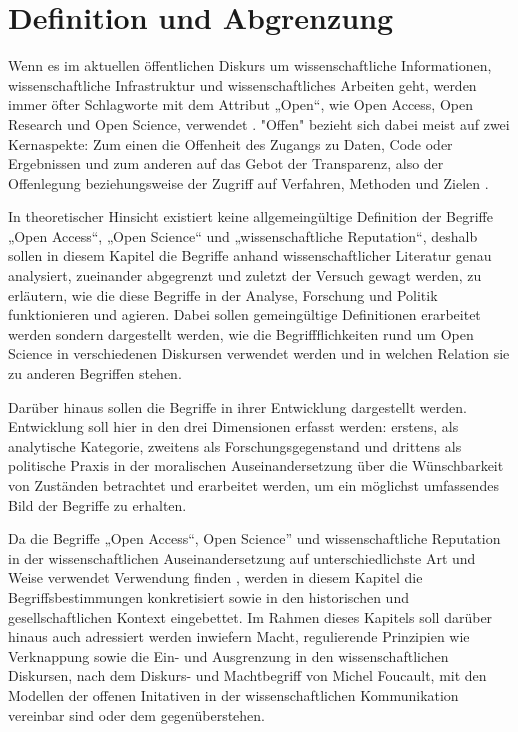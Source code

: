 \chapter{Definition und Abgrenzung} 
Wenn es im aktuellen öffentlichen Diskurs um wissenschaftliche Informationen, wissenschaftliche Infrastruktur und wissenschaftliches Arbeiten geht, werden immer öfter Schlagworte mit dem Attribut „Open“, wie Open Access, Open Research und Open Science, verwendet \cite{bunz_2014} \cite{schulze_2013_open}. "Offen" bezieht sich dabei meist auf zwei Kernaspekte: Zum einen die Offenheit des Zugangs zu Daten, Code oder Ergebnissen und zum anderen auf das Gebot der Transparenz, also der Offenlegung beziehungsweise der Zugriff auf Verfahren, Methoden und Zielen \cite{schulze_2013_open}.

In theoretischer Hinsicht existiert keine allgemeingültige Definition der Begriffe „Open Access“, „Open Science“ und „wissenschaftliche Reputation“, deshalb sollen in diesem Kapitel die Begriffe anhand wissenschaftlicher Literatur genau analysiert, zueinander abgegrenzt und zuletzt der Versuch gewagt werden, zu erläutern, wie die diese Begriffe in der Analyse, Forschung und Politik funktionieren und agieren. Dabei sollen gemeingültige Definitionen erarbeitet werden sondern dargestellt werden, wie die Begriffflichkeiten rund um Open Science in verschiedenen Diskursen verwendet werden und in welchen Relation sie zu anderen Begriffen stehen.

Darüber hinaus sollen die Begriffe in ihrer Entwicklung dargestellt werden. Entwicklung soll hier in den drei Dimensionen erfasst werden: erstens, als analytische Kategorie, zweitens als Forschungsgegenstand und drittens als politische Praxis in der moralischen Auseinandersetzung über die Wünschbarkeit von Zuständen betrachtet und erarbeitet werden, um ein möglichst umfassendes Bild der Begriffe zu erhalten. \cite{cite:10}

Da die Begriffe „Open Access“, Open Science” und wissenschaftliche Reputation in der wissenschaftlichen Auseinandersetzung auf unterschiedlichste Art und Weise verwendet Verwendung finden \cite{cite:9}, werden in diesem Kapitel die Begriffsbestimmungen konkretisiert sowie in den historischen und gesellschaftlichen Kontext eingebettet.
Im Rahmen dieses Kapitels soll darüber hinaus auch adressiert werden inwiefern Macht, regulierende Prinzipien wie Verknappung sowie die Ein- und Ausgrenzung in den wissenschaftlichen Diskursen, nach dem Diskurs- und Machtbegriff  von Michel Foucault, mit den Modellen der offenen Initativen in der wissenschaftlichen Kommunikation vereinbar sind oder dem gegenüberstehen.

